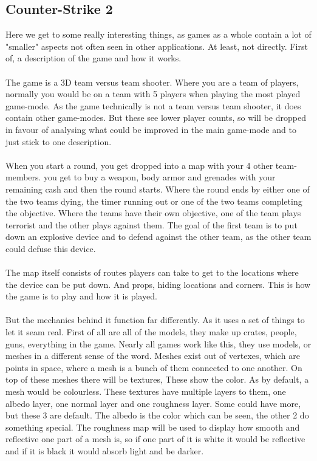 \newpage
\subsection{Counter-Strike 2}
Here we get to some really interesting things, as games as a whole contain a lot of "smaller" aspects not often seen in other applications. At least, not directly. First of, a description of the game and how it works. 
\\\\
The game is a 3D team versus team shooter. Where you are a team of players, normally you would be on a team with 5 players when playing the most played game-mode. As the game technically is not a team versus team shooter, it does contain other game-modes. But these see lower player counts, so will be dropped in favour of analysing what could be improved in the main game-mode and to just stick to one description. 
\\\\
When you start a round, you get dropped into a map with your 4 other team-members. you get to buy a weapon, body armor and grenades with your remaining cash and then the round starts. Where the round ends by either one of the two teams dying, the timer running out or one of the two teams completing the objective. Where the teams have their own objective, one of the team plays terrorist and the other plays against them. The goal of the first team is to put down an explosive device and to defend against the other team, as the other team could defuse this device.
\\\\
The map itself consists of routes players can take to get to the locations where the device can be put down. And props, hiding locations and corners. This is how the game is to play and how it is played. 
\\\\
But the mechanics behind it function far differently. As it uses a set of things to let it seam real. First of all are all of the models, they make up crates, people, guns, everything in the game. Nearly all games work like this, they use models, or meshes in a different sense of the word. Meshes exist out of vertexes, which are points in space, where a mesh is a bunch of them connected to one another. On top of these meshes there will be textures, These show the color. As by default, a mesh would be colourless. These textures have multiple layers to them, one albedo layer, one normal layer and one roughness layer. Some could have more, but these 3 are default. The albedo is the color which can be seen, the other 2 do something special. The roughness map will be used to display how smooth and reflective one part of a mesh is, so if one part of it is white it would be reflective and if it is black it would absorb light and be darker. 
